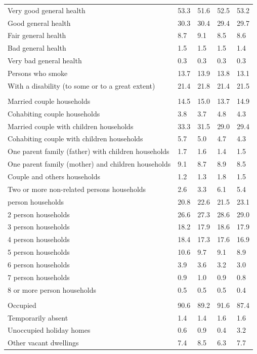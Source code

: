 \documentclass{article}
\begin{document}
\begin{table}[h]
\begin{tabular}{KTTTT}
    \hline
Very good general health & 53.3& 51.6&52.5& 53.2\\
Good general health & 30.3& 30.4& 29.4& 29.7\\
Fair general health & 8.7& 9.1&8.5& 8.6\\
Bad general health & 1.5& 1.5&1.5& 1.4\\
Very bad general health & 0.3& 0.3&0.3& 0.3\\
    \hline
Persons who smoke & 13.7& 13.9&13.8& 13.1\\
    \hline
With a disability (to some or to a great extent) & 21.4& 21.8&21.4& 21.5\\
\hline
    \\ 
    \hline
Married couple households & 14.5& 15.0& 13.7& 14.9\\
Cohabiting couple households & 3.8& 3.7& 4.8& 4.3\\
Married couple with children households & 33.3& 31.5& 29.0& 29.4\\
Cohabiting couple with children households & 5.7& 5.0& 4.7& 4.3\\
One parent family (father) with  children households & 1.7& 1.6& 1.4& 1.5\\
One parent family (mother) and children households & 9.1& 8.7& 8.9& 8.5\\
Couple and others households  & 1.2& 1.3& 1.8& 1.5\\
Two or more non-related persons households & 2.6& 3.3& 6.1& 5.4\\
     person households & 20.8& 22.6& 21.5& 23.1\\
2 person households & 26.6& 27.3& 28.6& 29.0\\
3 person households & 18.2& 17.9& 18.6& 17.9\\
4 person households & 18.4& 17.3& 17.6& 16.9\\
5 person households & 10.6&  9.7&  9.1&  8.9\\
6 person households & 3.9& 3.6& 3.2& 3.0\\
7 person households & 0.9& 1.0& 0.9& 0.8\\
8 or more person households & 0.5& 0.5& 0.5& 0.4\\
\hline
    \\ 
    \hline
Occupied & 90.6& 89.2& 91.6& 87.4\\
Temporarily absent & 1.4& 1.4& 1.6& 1.6\\
Unoccupied holiday homes & 0.6& 0.9& 0.4& 3.2\\
Other vacant dwellings & 7.4& 8.5& 6.3& 7.7\\
\hline
\end{tabular}
\end{table}
\end{document}
